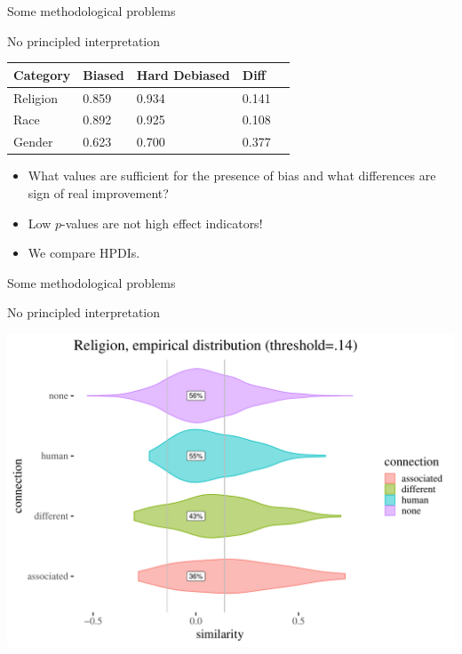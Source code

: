 \documentclass[
  10pt,
  ignorenonframetext,
  x11names, dvipsnames, bibspacing,natbib, table]{beamer}
\begin{document}
\begin{frame}{Some methodological problems}
\protect\hypertarget{some-methodological-problems-6}{}
\begin{block}{No principled interpretation}
\protect\hypertarget{no-principled-interpretation}{}
\begin{longtable}[]{@{}lllll@{}}
\toprule
Category & Biased & Hard Debiased & Diff & \\
\midrule
\endhead
Religion & 0.859 & 0.934 & 0.141 & \\
Race & 0.892 & 0.925 & 0.108 & \\
Gender & 0.623 & 0.700 & 0.377 & \\
\bottomrule
\end{longtable}

\begin{itemize}
\item
  What values are sufficient for the presence of bias and what
  differences are sign of real improvement?
\item
  Low \(p\)-values are not high effect indicators!
\item
  We compare HPDIs.
\end{itemize}
\end{block}
\end{frame}

\begin{frame}{Some methodological problems}
\protect\hypertarget{some-methodological-problems-7}{}
\begin{block}{No principled interpretation}
\protect\hypertarget{no-principled-interpretation-1}{}
\begin{center}\includegraphics[width=0.9\linewidth]{presentationBoston_files/figure-beamer/unnamed-chunk-6-1} \end{center}
\end{block}
\end{frame}
\end{document}
